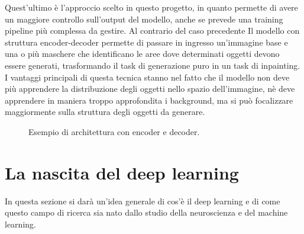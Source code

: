     Quest'ultimo è l'approccio scelto in questo progetto, in quanto permette di avere un maggiore controllo sull'output del modello,
    anche se prevede una training pipeline più complessa da gestire.
    Al contrario del caso precedente Il modello con struttura encoder-decoder permette di passare in ingresso un'immagine base e una o più maschere
    che identificano le aree dove determinati oggetti devono essere generati, trasformando il task di generazione puro in un task di inpainting.
    I vantaggi principali di questa tecnica stanno nel fatto che il modello non deve più apprendere la distribuzione degli oggetti nello spazio dell'immagine,
    nè deve apprendere in maniera troppo approfondita i background, ma si può focalizzare maggiormente sulla struttura degli oggetti da generare.
    
    \begin{figure}[H]
        \centering
        
        \caption{Esempio di architettura con encoder e decoder.}
        \label{fig:encoder_decoder_architecture}
    \end{figure}

\section{La nascita del deep learning \ok}

In questa sezione si darà un'idea generale di cos'è il deep learning e di come questo campo di ricerca sia nato dallo studio della
neuroscienza e del machine learning.

